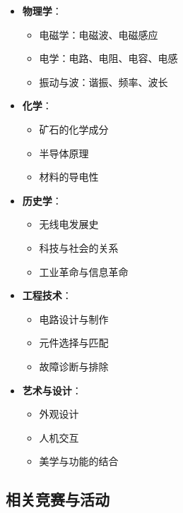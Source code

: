\documentclass[12pt,UTF8]{ctexbook}
\begin{document}
\begin{itemize}[leftmargin=3.5em]
    \item \textbf{物理学}：
        \begin{itemize}[leftmargin=3.5em]
            \item 电磁学：电磁波、电磁感应
            \item 电学：电路、电阻、电容、电感
            \item 振动与波：谐振、频率、波长
        \end{itemize}
    \item \textbf{化学}：
        \begin{itemize}[leftmargin=3.5em]
            \item 矿石的化学成分
            \item 半导体原理
            \item 材料的导电性
        \end{itemize}
    \item \textbf{历史学}：
        \begin{itemize}[leftmargin=3.5em]
            \item 无线电发展史
            \item 科技与社会的关系
            \item 工业革命与信息革命
        \end{itemize}
    \item \textbf{工程技术}：
        \begin{itemize}[leftmargin=3.5em]
            \item 电路设计与制作
            \item 元件选择与匹配
            \item 故障诊断与排除
        \end{itemize}
    \item \textbf{艺术与设计}：
        \begin{itemize}[leftmargin=3.5em]
            \item 外观设计
            \item 人机交互
            \item 美学与功能的结合
        \end{itemize}
\end{itemize}

\subsection{相关竞赛与活动}
\end{document}

